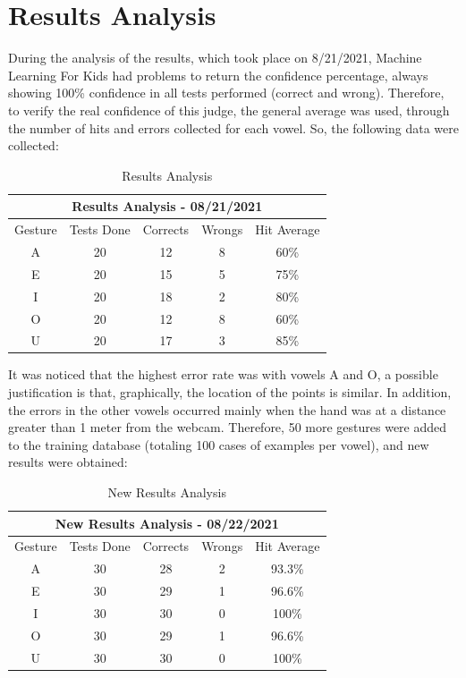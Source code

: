 \documentclass[a4paper, 12pt]{article}
\begin{document}
\section{Results Analysis}



During the analysis of the results, which took place on 8/21/2021, Machine Learning For Kids had problems to return the confidence percentage, always showing 100\% confidence in all tests performed (correct and wrong). Therefore, to verify the real confidence of this judge, the general average was used, through the number of hits and errors collected for each vowel. So, the following data were collected:


\begin{table}[h!]
    \centering
    \begin{tabular}{ |c|c|c|c|c| } 
    \hline
    \multicolumn{5}{|c|}{Results Analysis - 08/21/2021} \\
    \hline
    Gesture & Tests Done & Corrects & Wrongs & Hit Average \\
    \hline
    A & 20 & 12 & 8 & 60\% \\ 
    \hline
    E & 20 & 15 & 5 & 75\% \\
    \hline
    I & 20 & 18 & 2 & 80\% \\
    \hline
    O & 20 & 12 & 8 & 60\% \\
    \hline
    U & 20 & 17 & 3 & 85\% \\
    \hline
    \end{tabular}
    \caption{Results Analysis}
    \label{tab:results_analysis}
\end{table}

It was noticed that the highest error rate was with vowels A and O, a possible justification is that, graphically, the location of the points is similar. In addition, the errors in the other vowels occurred mainly when the hand was at a distance greater than 1 meter from the webcam. Therefore, 50 more gestures were added to the training database (totaling 100 cases of examples per vowel), and new results were obtained:

\begin{table}[h!]
    \centering
    \begin{tabular}{ |c|c|c|c|c| } 
    \hline
    \multicolumn{5}{|c|}{New Results Analysis - 08/22/2021} \\
    \hline
    Gesture & Tests Done & Corrects & Wrongs & Hit Average \\
    \hline
    A & 30 & 28 & 2 & 93.3\% \\ 
    \hline
    E & 30 & 29 & 1 & 96.6\% \\
    \hline
    I & 30 & 30 & 0 & 100\% \\
    \hline
    O & 30 & 29 & 1 & 96.6\% \\
    \hline
    U & 30 & 30 & 0 & 100\% \\
    \hline
    \end{tabular}
    \caption{New Results Analysis}
    \label{tab:results_analysis2}
\end{table}
\end{document}
